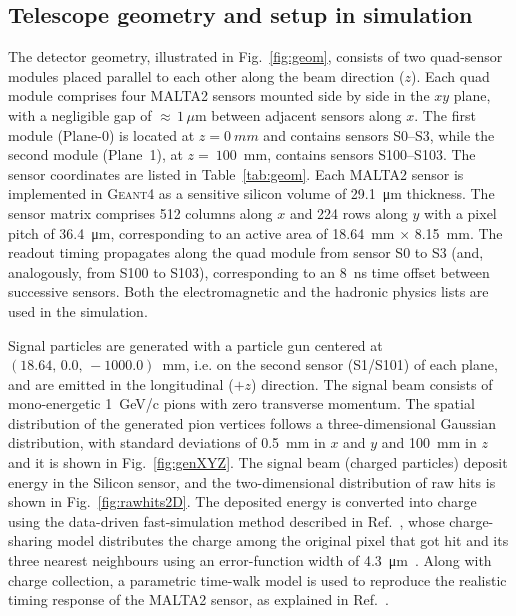 \subsection{Telescope geometry and setup in simulation}\label{sec:geometry}
The detector geometry, illustrated in Fig.~\ref{fig:geom}, consists of two quad-sensor modules placed parallel to each other along the beam direction ($z$). Each quad module comprises four MALTA2 sensors mounted side by side in the $xy$ plane, with a negligible gap of ${\approx}\,1\,\mu\mathrm{m}$ between adjacent sensors along $x$. The first module (Plane-0) is located at $z=0~mm$ and contains sensors S0--S3, while the second module (Plane~1), at $z=~100$~mm, contains sensors S100--S103. The sensor coordinates are listed in Table~\ref{tab:geom}. Each MALTA2 sensor is implemented in \textsc{Geant4} as a sensitive silicon volume of \SI{29.1}{\micro\meter} thickness. The sensor matrix comprises 512 columns along $x$ and 224 rows along $y$ with a pixel pitch of \SI{36.4}{\micro\meter}, corresponding to an active area of \SI{18.64}{\milli\meter} $\times$ \SI{8.15}{\milli\meter}. The readout timing propagates along the quad module from sensor S0 to S3 (and, analogously, from S100 to S103), corresponding to an \SI{8}{\nano\second} time offset between successive sensors. Both the electromagnetic and the hadronic physics lists are used in the simulation.

Signal particles are generated with a particle gun centered at $(18.64,\,0.0,\,-1000.0)$~mm, i.e. on the second sensor (S1/S101) of each plane, and are emitted in the longitudinal ($+z$) direction. The signal beam consists of mono-energetic \SI{1}{\giga\electronvolt/c} pions with zero transverse momentum.  
The spatial distribution of the generated pion vertices follows a three-dimensional Gaussian distribution, with standard deviations of 0.5~mm in $x$ and $y$ and 100~mm in $z$ and it is shown in Fig.~\ref{fig:genXYZ}. The signal beam (charged particles) deposit energy in the Silicon sensor, and the two-dimensional distribution of raw hits is shown in Fig.~\ref{fig:rawhits2D}. The deposited energy is converted into charge using the data-driven fast-simulation method described in Ref.~\cite{FastSim}, whose charge-sharing model distributes the charge among the original pixel that got hit and its three nearest neighbours using an error-function width of \SI{4.3}{\micro\meter}~\cite{MALTA2_CCParameterization}. Along with charge collection, a parametric time-walk model is used to reproduce the realistic timing response of the MALTA2 sensor, as explained in Ref.~\cite{FastSim}. 


